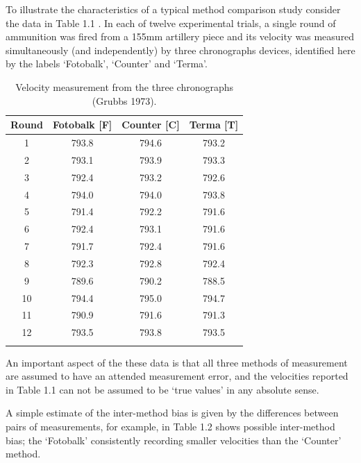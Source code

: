 \documentclass[12pt, a4paper]{report}
\theoremstyle{plain}
\theoremstyle{definition}
\theoremstyle{remark}
\begin{document}
	To illustrate the characteristics of a typical method comparison
	study consider the data in Table 1.1 \citep{Grubbs73}. In each of
	twelve experimental trials, a single round of ammunition was fired
	from a 155mm artillery piece and its velocity was measured simultaneously (and
	independently) by three chronographs devices, identified here by
	the labels `Fotobalk', `Counter' and `Terma'.
	\smallskip
	\begin{table}[ht]
		\begin{center}
			\begin{tabular}{cccc}
				\hline
				Round& Fotobalk [F] & Counter [C]& Terma [T]\\
				\hline
				1 & 793.8 & 794.6 & 793.2 \\
				2 & 793.1 & 793.9 & 793.3 \\
				3 & 792.4 & 793.2 & 792.6 \\
				4 & 794.0 & 794.0 & 793.8 \\
				5 & 791.4 & 792.2 & 791.6 \\
				6 & 792.4 & 793.1 & 791.6 \\
				7 & 791.7 & 792.4 & 791.6 \\
				8 & 792.3 & 792.8 & 792.4 \\
				9 & 789.6 & 790.2 & 788.5 \\
				10 & 794.4 & 795.0 & 794.7 \\
				11 & 790.9 & 791.6 & 791.3 \\
				12 & 793.5 & 793.8 & 793.5 \\
			\phantom{makespace} & \phantom{makespace} & \phantom{makespace} & \phantom{makespace} \\
			\end{tabular}
			\caption{Velocity measurement from the three chronographs (Grubbs
				1973).}
		\end{center}
		\label{FCTdata}
	\end{table}
	
	An important aspect of the these data is that all three methods of
	measurement are assumed to have an attended measurement error, and
	the velocities reported in Table 1.1 can not be assumed to be
	`true values' in any absolute sense.
	
	 A simple estimate of the
	inter-method bias is given by the differences between pairs of measurements, for example, in Table 1.2 shows possible inter-method bias; the `Fotobalk' consistently recording
	smaller velocities than the `Counter' method. 
	
\end{document}
